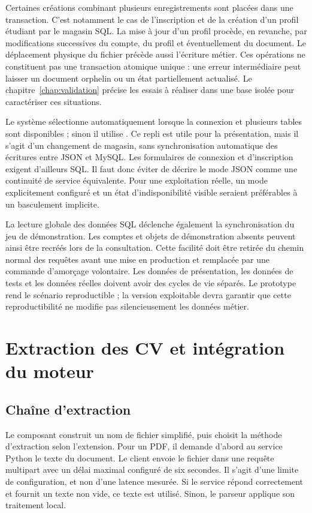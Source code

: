 Certaines créations combinant plusieurs enregistrements sont placées dans une transaction. C'est notamment le cas de l'inscription et de la création d'un profil étudiant par le magasin SQL. La mise à jour d'un profil procède, en revanche, par modifications successives du compte, du profil et éventuellement du document. Le déplacement physique du fichier précède aussi l'écriture métier. Ces opérations ne constituent pas une transaction atomique unique : une erreur intermédiaire peut laisser un document orphelin ou un état partiellement actualisé. Le chapitre~\ref{chap:validation} précise les essais à réaliser dans une base isolée pour caractériser ces situations.

Le système sélectionne automatiquement  lorsque la connexion et plusieurs tables sont disponibles ; sinon il utilise . Ce repli est utile pour la présentation, mais il s'agit d'un changement de magasin, sans synchronisation automatique des écritures entre JSON et MySQL. Les formulaires de connexion et d'inscription exigent d'ailleurs SQL. Il faut donc éviter de décrire le mode JSON comme une continuité de service équivalente. Pour une exploitation réelle, un mode explicitement configuré et un état d'indisponibilité visible seraient préférables à un basculement implicite.

La lecture globale des données SQL déclenche également la synchronisation du jeu de démonstration. Les comptes et objets de démonstration absents peuvent ainsi être recréés lors de la consultation. Cette facilité doit être retirée du chemin normal des requêtes avant une mise en production et remplacée par une commande d'amorçage volontaire. Les données de présentation, les données de tests et les données réelles doivent avoir des cycles de vie séparés. Le prototype rend le scénario reproductible ; la version exploitable devra garantir que cette reproductibilité ne modifie pas silencieusement les données métier.

\section{Extraction des CV et intégration du moteur}

\subsection{Chaîne d'extraction}

Le composant  construit un nom de fichier simplifié, puis choisit la méthode d'extraction selon l'extension. Pour un PDF, il demande d'abord au service Python le texte du document. Le client envoie le fichier dans une requête multipart avec un délai maximal configuré de six secondes. Il s'agit d'une limite de configuration, et non d'une latence mesurée. Si le service répond correctement et fournit un texte non vide, ce texte est utilisé. Sinon, le parseur applique son traitement local.

